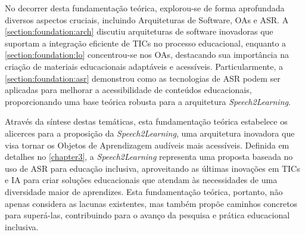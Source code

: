 No decorrer desta fundamentação teórica, explorou-se de forma aprofundada diversos aspectos cruciais, incluindo Arquiteturas de Software, OAs e ASR. A \autoref{section:foundation:arch} discutiu arquiteturas de software inovadoras que suportam a integração eficiente de TICs no processo educacional, enquanto a \autoref{section:foundation:lo} concentrou-se nos OAs, destacando sua importância na criação de materiais educacionais adaptáveis e acessíveis. Particularmente, a \autoref{section:foundation:asr} demonstrou como as tecnologias de ASR podem ser aplicadas para melhorar a acessibilidade de conteúdos educacionais, proporcionando uma base teórica robusta para a arquitetura \textit{Speech2Learning}.

Através da síntese destas temáticas, esta fundamentação teórica estabelece os alicerces para a proposição da \textit{Speech2Learning}, uma arquitetura inovadora que visa tornar os Objetos de Aprendizagem audíveis mais acessíveis. Definida em detalhes no \autoref{chapter3}, a \textit{Speech2Learning} representa uma proposta baseada no uso de ASR para educação inclusiva, aproveitando as últimas inovações em TICs e IA para criar soluções educacionais que atendam às necessidades de uma diversidade maior de aprendizes. Esta fundamentação teórica, portanto, não apenas considera as lacunas existentes, mas também propõe caminhos concretos para superá-las, contribuindo para o avanço da pesquisa e prática educacional inclusiva.